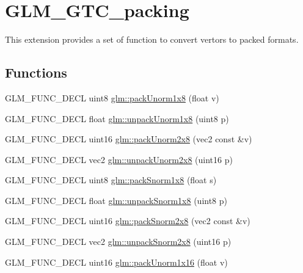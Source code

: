\hypertarget{group__gtc__packing}{\section{G\-L\-M\-\_\-\-G\-T\-C\-\_\-packing}
\label{group__gtc__packing}
}


This extension provides a set of function to convert vertors to packed formats.  


\subsection*{Functions}
\begin{DoxyCompactItemize}
\item 
G\-L\-M\-\_\-\-F\-U\-N\-C\-\_\-\-D\-E\-C\-L uint8 \hyperlink{group__gtc__packing_ga4b2fa60df3460403817d28b082ee0736}{glm\-::pack\-Unorm1x8} (float v)
\item 
G\-L\-M\-\_\-\-F\-U\-N\-C\-\_\-\-D\-E\-C\-L float \hyperlink{group__gtc__packing_ga1319207e30874fb4931a9ee913983ee1}{glm\-::unpack\-Unorm1x8} (uint8 p)
\item 
G\-L\-M\-\_\-\-F\-U\-N\-C\-\_\-\-D\-E\-C\-L uint16 \hyperlink{group__gtc__packing_ga9a666b1c688ab54100061ed06526de6e}{glm\-::pack\-Unorm2x8} (vec2 const \&v)
\item 
G\-L\-M\-\_\-\-F\-U\-N\-C\-\_\-\-D\-E\-C\-L vec2 \hyperlink{group__gtc__packing_ga637cbe3913dd95c6e7b4c99c61bd611f}{glm\-::unpack\-Unorm2x8} (uint16 p)
\item 
G\-L\-M\-\_\-\-F\-U\-N\-C\-\_\-\-D\-E\-C\-L uint8 \hyperlink{group__gtc__packing_gae3592e0795e62aaa1865b3a10496a7a1}{glm\-::pack\-Snorm1x8} (float s)
\item 
G\-L\-M\-\_\-\-F\-U\-N\-C\-\_\-\-D\-E\-C\-L float \hyperlink{group__gtc__packing_ga4851ff86678aa1c7ace9d67846894285}{glm\-::unpack\-Snorm1x8} (uint8 p)
\item 
G\-L\-M\-\_\-\-F\-U\-N\-C\-\_\-\-D\-E\-C\-L uint16 \hyperlink{group__gtc__packing_ga6be3cfb2cce3702f03e91bbeb5286d7e}{glm\-::pack\-Snorm2x8} (vec2 const \&v)
\item 
G\-L\-M\-\_\-\-F\-U\-N\-C\-\_\-\-D\-E\-C\-L vec2 \hyperlink{group__gtc__packing_ga8b128e89be449fc71336968a66bf6e1a}{glm\-::unpack\-Snorm2x8} (uint16 p)
\item 
G\-L\-M\-\_\-\-F\-U\-N\-C\-\_\-\-D\-E\-C\-L uint16 \hyperlink{group__gtc__packing_ga9f82737bf2a44bedff1d286b76837886}{glm\-::pack\-Unorm1x16} (float v)
\item 

\end{DoxyCompactItemize}
